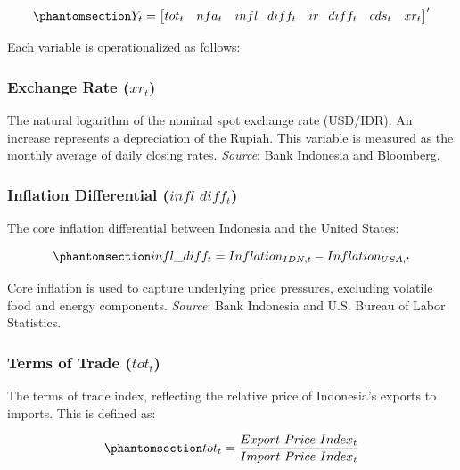 \documentclass[
  manuscript=article,
  layout=publish,
  year=2026,
  volume=6,
]{den}
\begin{document}
\begin{equation}\phantomsection\label{eq-variable-vector}{
Y_t = \begin{bmatrix} tot_t & nfa_t & infl\_diff_t & ir\_diff_t & cds_t & xr_t \end{bmatrix}'
}\end{equation}

Each variable is operationalized as follows:

\subsubsection{\texorpdfstring{Exchange Rate
(\(xr_t\))}{Exchange Rate (xr\_t)}}\label{exchange-rate-xr_t}

The natural logarithm of the nominal spot exchange rate (USD/IDR). An
increase represents a depreciation of the Rupiah. This variable is
measured as the monthly average of daily closing rates. \emph{Source}:
Bank Indonesia and Bloomberg.

\subsubsection{\texorpdfstring{Inflation Differential
(\(infl\_diff_t\))}{Inflation Differential (infl\textbackslash\_diff\_t)}}\label{inflation-differential-infl_diff_t}

The core inflation differential between Indonesia and the United States:

\begin{equation}\phantomsection\label{eq-inflation-differential}{
infl\_diff_t = Inflation_{IDN,t} - Inflation_{USA,t}
}\end{equation}

Core inflation is used to capture underlying price pressures, excluding
volatile food and energy components. \emph{Source}: Bank Indonesia and
U.S. Bureau of Labor Statistics.

\subsubsection{\texorpdfstring{Terms of Trade
(\(tot_t\))}{Terms of Trade (tot\_t)}}\label{terms-of-trade-tot_t}

The terms of trade index, reflecting the relative price of Indonesia's
exports to imports. This is defined as:

\begin{equation}\phantomsection\label{eq-terms-of-trade}{
tot_t = \frac{Export\ Price\ Index_t}{Import\ Price\ Index_t}
}\end{equation}
\end{document}
